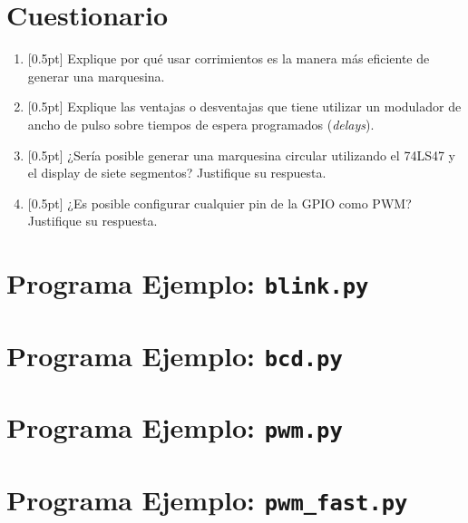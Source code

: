 \documentclass[letterpaper,10.5pt]{article}
\begin{document}
%
%
\section{Cuestionario}%
\label{sec:questionnaire}
\begin{enumerate}
	\item{} [0.5pt] Explique por qué usar corrimientos es la manera más eficiente de generar una marquesina.
	\item{} [0.5pt] Explique las ventajas o desventajas que tiene utilizar un modulador de ancho de pulso sobre tiempos de espera programados (\emph{delays}).
	\item{} [0.5pt] ¿Sería posible generar una marquesina circular utilizando el 74LS47 y el display de siete segmentos? Justifique su respuesta.
	\item{} [0.5pt] ¿Es posible configurar cualquier pin de la GPIO como PWM? Justifique su respuesta.
\end{enumerate}

\appendix

\cleardoublepage
\section{Programa Ejemplo: \texttt{blink.py}}%
\label{sec:appendix1}


\cleardoublepage
\section{Programa Ejemplo: \texttt{bcd.py}}%
\label{sec:appendix2}


\cleardoublepage
\section{Programa Ejemplo: \texttt{pwm.py}}%
\label{sec:appendix3}


\cleardoublepage
\section{Programa Ejemplo: \texttt{pwm\_fast.py}}%
\label{sec:appendix3}
\end{document}
